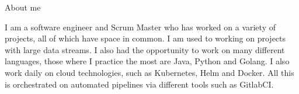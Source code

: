\documentclass[
	11pt, %
]{resume}
\begin{document}

\begin{rSection}{About me}

	I am a software engineer and Scrum Master who has worked on a variety of projects, all of which have space in common. 
	I am used to working on projects with large data streams. I also had the opportunity to work on many different languages, those where I practice the most are Java, Python and Golang. 
	I also work daily on cloud technologies, such as Kubernetes, Helm and Docker. All this is orchestrated on automated pipelines via different tools such as GitlabCI.

\end{rSection}
\end{document}
